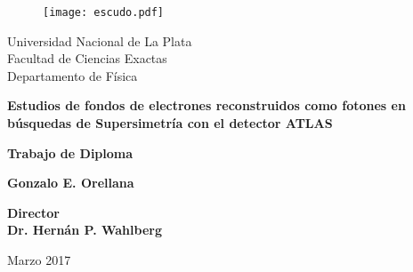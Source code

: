 


\thispagestyle{empty}
\begin{center}

\begin{figure}[h]
\centering
\texttt{[image: escudo.pdf]}
\end{figure}

{\normalsize Universidad Nacional de La Plata\\}
{\normalsize Facultad de Ciencias Exactas\\}
{\normalsize Departamento de Física\\}


\vspace{2cm}

\hrulefill

{\bf \LARGE  Estudios de fondos de electrones reconstruidos como fotones en búsquedas de Supersimetría con el detector ATLAS\\}

\vspace{0.6cm}

\hrulefill

\vspace{0.3cm}

{\normalsize \bf Trabajo de Diploma \\}

\vspace{2.5cm}

{\large \bf Gonzalo E. Orellana \\}

\vspace{2.5cm}

{\large\bf Director \\}
{\large\bf Dr. Hernán P. Wahlberg \\}

\vspace{3cm}

{\normalsize Marzo 2017}

\end{center}



\restoregeometry




